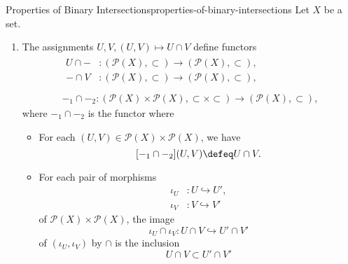 \begin{proposition}{Properties of Binary Intersections}{properties-of-binary-intersections}%
    Let $X$ be a set.
    \begin{enumerate}
        \item\label{properties-of-binary-intersections-functoriality}The assignments $U,V,(U,V)\mapsto U\cap V$ define functors
            \begin{gather*}
                \begin{aligned}
                    U\cap-         &\colon (\mathcal{P}(X),\subset)                                  \to (\mathcal{P}(X),\subset),\\
                    -\cap V        &\colon (\mathcal{P}(X),\subset)                                  \to (\mathcal{P}(X),\subset),\\
                \end{aligned}\\
                -_{1}\cap-_{2} \colon (\mathcal{P}(X)\times\mathcal{P}(X),\subset\times\subset) \to (\mathcal{P}(X),\subset),
            \end{gather*}
            where $-_{1}\cap-_{2}$ is the functor where
            \begin{itemize}
                \item{}For each $(U,V)\in\mathcal{P}(X)\times\mathcal{P}(X)$, we have
                    \[
                        [-_{1}\cap-_{2}](U,V)%
                        \defeq
                        U\cap V.%
                    \]%
                \item{}For each pair of morphisms
                    \begin{align*}
                        \iota_{U} &\colon U\hookrightarrow U',\\
                        \iota_{V} &\colon V\hookrightarrow V'
                    \end{align*}
                    of $\mathcal{P}(X)\times\mathcal{P}(X)$, the image
                    \[
                        \iota_{U}\cap\iota_{V}%
                        \colon%
                        U\cap V%
                        \hookrightarrow%
                        U'\cap V'%
                    \]%
                    of $(\iota_{U},\iota_{V})$ by $\cap$ is the inclusion
                    \[
                        U\cap V%
                        \subset%
                        U'\cap V'%
                    \]%

\end{itemize}
\end{enumerate}
\end{proposition}
